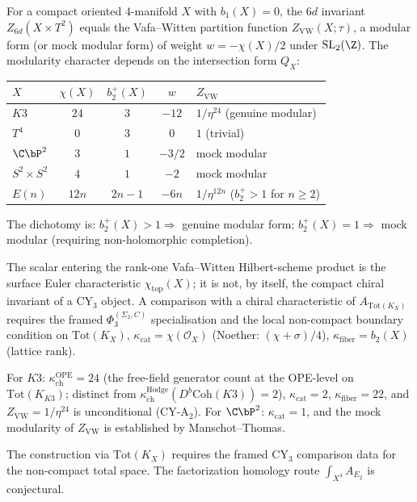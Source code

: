 \begin{conjecture}
\label{conj:four-manifold-6d-invariants}
\ClaimStatusConjectured
{}%
For a compact oriented $4$-manifold $X$ with $b_1(X) = 0$, the $6d$
invariant $Z_{6d}(X \times T^2)$ equals the Vafa--Witten partition
function $Z_{\mathrm{VW}}(X; \tau)$, a modular form
\textup{(}or mock modular form\textup{)} of weight $w = -\chi(X)/2$
under $\mathrm{SL}_2(\Z)$. The modularity character depends on the
intersection form $Q_X$:
\begin{center}
\small
\renewcommand{\arraystretch}{1.15}
\begin{tabular}{lcccl}
\toprule
$X$ & $\chi(X)$ & $b_2^+(X)$ & $w$ & $Z_{\mathrm{VW}}$ \\
\midrule
$K3$ & $24$ & $3$ & $-12$ & $1/\eta^{24}$ \textup{(}genuine modular\textup{)} \\
$T^4$ & $0$ & $3$ & $0$ & $1$ \textup{(}trivial\textup{)} \\
$\C\bP^2$ & $3$ & $1$ & $-3/2$ & mock modular \\
$S^2 \times S^2$ & $4$ & $1$ & $-2$ & mock modular \\
$E(n)$ & $12n$ & $2n{-}1$ & $-6n$ & $1/\eta^{12n}$ \textup{(}$b_2^+ > 1$ for $n \geq 2$\textup{)} \\
\bottomrule
\end{tabular}
\end{center}

The dichotomy is: $b_2^+(X) > 1 \Rightarrow$ genuine modular form;
$b_2^+(X) = 1 \Rightarrow$ mock modular \textup{(}requiring
non-holomorphic completion\textup{)}.

The scalar entering the rank-one Vafa--Witten Hilbert-scheme product is
the surface Euler characteristic $\chi_{\mathrm{top}}(X)$; it is not, by
itself, the compact chiral invariant of a CY$_3$ object. A comparison
with a chiral characteristic of $A_{\mathrm{Tot}(K_X)}$ requires the
framed $\Phi_3^{(\Sigma_2,C)}$ specialisation and the local
non-compact boundary condition on $\mathrm{Tot}(K_X)$,
$\kappa_{\mathrm{cat}} = \chi(\mathcal{O}_X)$ \textup{(}Noether:
$(\chi + \sigma)/4$\textup{)},
$\kappa_{\mathrm{fiber}} = b_2(X)$ \textup{(}lattice rank\textup{)}.

For $K3$: $\kappa_{\mathrm{ch}}^{\mathrm{OPE}} = 24$ (the free-field
generator count at the OPE-level on $\mathrm{Tot}(K_{K3})$;
distinct from $\kappa_{\mathrm{ch}}^{\mathrm{Hodge}}(D^b\mathrm{Coh}(K3)) = 2$),
$\kappa_{\mathrm{cat}} = 2$,
$\kappa_{\mathrm{fiber}} = 22$, and $Z_{\mathrm{VW}} = 1/\eta^{24}$
is unconditional \textup{(}CY-A$_2$\textup{)}. For $\C\bP^2$:
$\kappa_{\mathrm{cat}} = 1$, and the mock modularity of $Z_{\mathrm{VW}}$
is established by Manschot--Thomas.

The construction via $\mathrm{Tot}(K_X)$ requires the framed CY$_3$
comparison data for the non-compact total space. The factorization homology route
$\int_{X^4} A_{E_2}$ is conjectural.
\end{conjecture}

